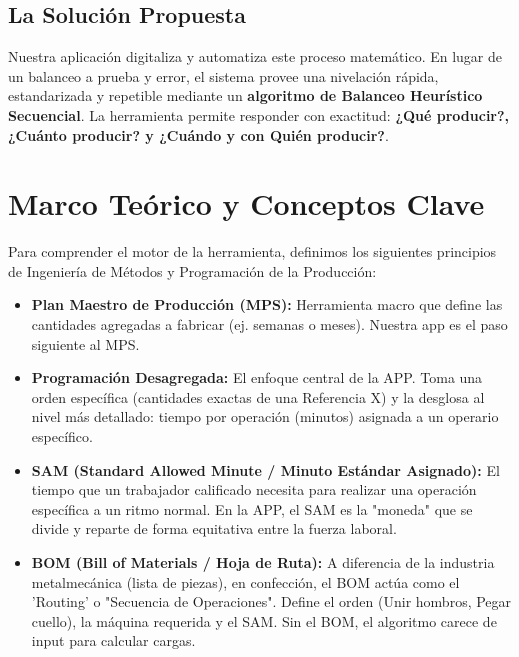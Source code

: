 \documentclass[12pt,a4paper]{article}
\begin{document}
\subsection{La Solución Propuesta}
Nuestra aplicación digitaliza y automatiza este proceso matemático. En lugar de un balanceo a prueba y error, el sistema provee una nivelación rápida, estandarizada y repetible mediante un \textbf{algoritmo de Balanceo Heurístico Secuencial}. La herramienta permite responder con exactitud: \textbf{¿Qué producir?, ¿Cuánto producir? y ¿Cuándo y con Quién producir?}.

\section{Marco Teórico y Conceptos Clave}

Para comprender el motor de la herramienta, definimos los siguientes principios de Ingeniería de Métodos y Programación de la Producción:

\begin{itemize}
    \item \textbf{Plan Maestro de Producción (MPS):} Herramienta macro que define las cantidades agregadas a fabricar (ej. semanas o meses). Nuestra app es el paso siguiente al MPS.
    \item \textbf{Programación Desagregada:} El enfoque central de la APP. Toma una orden específica (cantidades exactas de una Referencia X) y la desglosa al nivel más detallado: tiempo por operación (minutos) asignada a un operario específico.
    \item \textbf{SAM (Standard Allowed Minute / Minuto Estándar Asignado):} El tiempo que un trabajador calificado necesita para realizar una operación específica a un ritmo normal. En la APP, el SAM es la "moneda" que se divide y reparte de forma equitativa entre la fuerza laboral.
    \item \textbf{BOM (Bill of Materials / Hoja de Ruta):} A diferencia de la industria metalmecánica (lista de piezas), en confección, el BOM actúa como el 'Routing' o "Secuencia de Operaciones". Define el orden (Unir hombros, Pegar cuello), la máquina requerida y el SAM. Sin el BOM, el algoritmo carece de input para calcular cargas.
\end{itemize}
\end{document}
